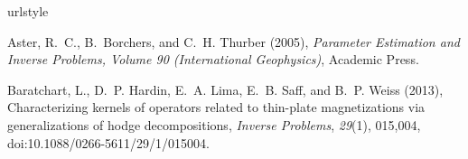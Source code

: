 \documentclass[galley,gc]{agutex}
\begin{document}
\begin{article}
%
%
%
%
%
%

%
%
%

%
%


%
%
%

\begin{thebibliography}{42}
\providecommand{\natexlab}[1]{#1}
\expandafter\ifx\csname urlstyle\endcsname\relax
  \providecommand{\doi}[1]{doi:\discretionary{}{}{}#1}\else
  \providecommand{\doi}{doi:\discretionary{}{}{}\begingroup
  \urlstyle{rm}\Url}\fi

Aster, R.~C., B.~Borchers, and C.~H. Thurber (2005), \textit{Parameter
  Estimation and Inverse Problems, Volume 90 (International Geophysics)},
  Academic Press.

Baratchart, L., D.~P. Hardin, E.~A. Lima, E.~B. Saff, and B.~P. Weiss (2013),
  Characterizing kernels of operators related to thin-plate magnetizations via
  generalizations of hodge decompositions, \textit{Inverse Problems},
  \textit{29}(1), 015,004, \doi{10.1088/0266-5611/29/1/015004}.


\end{thebibliography}
\end{article}
\end{document}

